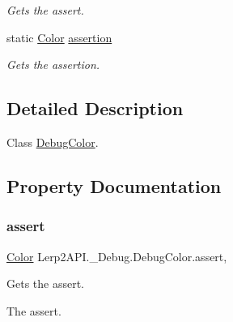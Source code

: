 \begin{DoxyCompactItemize}
\begin{DoxyCompactList}\small\item\em Gets the assert. \end{DoxyCompactList}\item 
static \hyperlink{struct_lerp2_a_p_i_1_1_optimizers_1_1_color}{Color} \hyperlink{class_lerp2_a_p_i_1_1___debug_1_1_debug_color_a0ae45140867cbf03867d3a3b128a463b}{assertion}
\begin{DoxyCompactList}\small\item\em Gets the assertion. \end{DoxyCompactList}\end{DoxyCompactItemize}


\subsection{Detailed Description}
Class \hyperlink{class_lerp2_a_p_i_1_1___debug_1_1_debug_color}{Debug\+Color}. 



\subsection{Property Documentation}
\mbox{\label{class_lerp2_a_p_i_1_1___debug_1_1_debug_color_a82da989feb2461fe9716edca87ce8fac}} 
\subsubsection{\texorpdfstring{assert}{assert}}
{\footnotesize\ttfamily \hyperlink{struct_lerp2_a_p_i_1_1_optimizers_1_1_color}{Color} Lerp2\+A\+P\+I.\+\_\+\+Debug.\+Debug\+Color.\+assert\hspace{0.3cm}{\ttfamily [static]}, {\ttfamily [get]}}



Gets the assert. 

The assert.\mbox{\label{class_lerp2_a_p_i_1_1___debug_1_1_debug_color_a0ae45140867cbf03867d3a3b128a463b}} 
